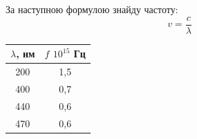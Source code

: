 \documentclass[a4paper,14pt]{extreport}
\begin{document}
	За наступною формулою знайду  частоту:
	\begin{equation}{}
		 v = \dfrac{c}{\lambda}
		\label{eq1}
	\end{equation}
	\begin{table}[h]
		\begin{center}
			\begin{tabular}{|c|c|}
			\hline
			$\lambda$, нм & $f$ $10^{15}$ Гц \\ \hline
			200               & 1,5                   \\ \hline
			400               & 0,7                  \\ \hline
			440               & 0,6                  \\ \hline
			470               & 0,6                  \\ \hline
			\end{tabular}
		\end{center}
	\end{table}
	
			
	

	

	
			
\end{document}
